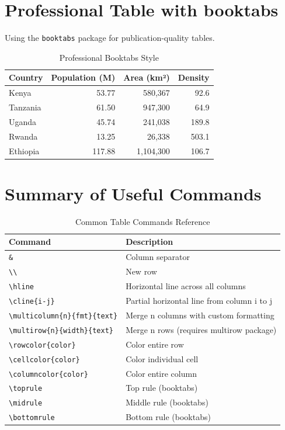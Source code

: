 \documentclass[12pt]{article}
\begin{document}
	\section{Professional Table with booktabs}
	Using the \texttt{booktabs} package for publication-quality tables.
	
	\begin{table}[h!]
		\centering
		\caption{Professional Booktabs Style}
		\label{table:booktabs}
		\begin{tabular}{l r r r}
			\toprule
			\textbf{Country} & \textbf{Population (M)} & \textbf{Area (km²)} & \textbf{Density} \\
			\midrule
			Kenya & 53.77 & 580,367 & 92.6 \\
			Tanzania & 61.50 & 947,300 & 64.9 \\
			Uganda & 45.74 & 241,038 & 189.8 \\
			Rwanda & 13.25 & 26,338 & 503.1 \\
			Ethiopia & 117.88 & 1,104,300 & 106.7 \\
			\bottomrule
		\end{tabular}
	\end{table}
	
	\section*{Summary of Useful Commands}
	
	\begin{table}[h!]
		\centering
		\caption{Common Table Commands Reference}
		\label{table:commands}
		\begin{tabular}{|p{4cm}|p{8cm}|}
			\hline
			\textbf{Command} & \textbf{Description} \\
			\hline
			\texttt{\&} & Column separator \\
			\texttt{\textbackslash\textbackslash} & New row \\
			\texttt{\textbackslash hline} & Horizontal line across all columns \\
			\texttt{\textbackslash cline\{i-j\}} & Partial horizontal line from column i to j \\
			\texttt{\textbackslash multicolumn\{n\}\{fmt\}\{text\}} & Merge n columns with custom formatting \\
			\texttt{\textbackslash multirow\{n\}\{width\}\{text\}} & Merge n rows (requires multirow package) \\
			\texttt{\textbackslash rowcolor\{color\}} & Color entire row \\
			\texttt{\textbackslash cellcolor\{color\}} & Color individual cell \\
			\texttt{\textbackslash columncolor\{color\}} & Color entire column \\
			\texttt{\textbackslash toprule} & Top rule (booktabs) \\
			\texttt{\textbackslash midrule} & Middle rule (booktabs) \\
			\texttt{\textbackslash bottomrule} & Bottom rule (booktabs) \\
			\hline
		\end{tabular}
	\end{table}
	
\end{document}
